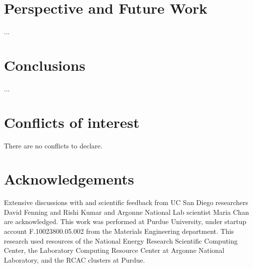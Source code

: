 \documentclass[twoside,twocolumn,9pt]{article}
\begin{document}
    \newpage



    \section*{Perspective and Future Work}
    
    ... \\



    \section*{Conclusions}

    ... \\


    \section*{Conflicts of interest}
    There are no conflicts to declare.

    \section*{Acknowledgements}
    Extensive discussions with and scientific feedback from UC San Diego
    researchers David Fenning and Rishi Kumar and Argonne National Lab
    scientist Maria Chan are acknowledged. This work was performed at
    Purdue University, under startup account F.10023800.05.002 from the
    Materials Engineering department. This research used resources of the
    National Energy Research Scientific Computing Center, the Laboratory
    Computing Resource Center at Argonne National Laboratory, and the RCAC
    clusters at Purdue.


    \balance







    \clearpage
    \newpage
    \setcounter{page}{1}


    \setcounter{figure}{0}   
    \setcounter{table}{0} 
    \renewcommand{\thetable}{S\Roman{table}} 
    \renewcommand\thefigure{S\arabic{figure}}
    
\end{document}
